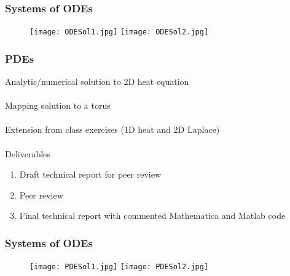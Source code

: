 \documentclass{beamer}
\begin{document}
\begin{frame}
\begin{center}
\frametitle{Systems of ODEs}

\begin{figure}

\texttt{[image: ODESol1.jpg]}
\hspace{7.5 mm}
\texttt{[image: ODESol2.jpg]}

\end{figure}

\end{center}
\end{frame}


\begin{frame}
\begin{center}
\frametitle{PDEs}

Analytic/numerical solution to 2D heat equation\\

~\\

Mapping solution to a torus\\

~\\

Extension from class exercises (1D heat and 2D Laplace)\\

~\\

Deliverables

\begin{enumerate}

\item Draft technical report for peer review

\item Peer review

\item Final technical report with commented Mathematica and Matlab code

\end{enumerate}

\end{center}
\end{frame}


\begin{frame}
\begin{center}
\frametitle{Systems of ODEs}

\begin{figure}

\texttt{[image: PDESol1.jpg]}
\hspace{7.5 mm}
\texttt{[image: PDESol2.jpg]}

\end{figure}

\end{center}
\end{frame}
\end{document}
